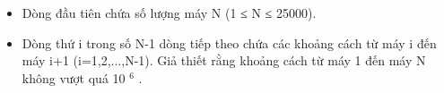 \begin{itemize}
	\item     Dòng đầu tiên chứa số lượng máy N (1 ≤ N ≤ 25000).   
	\item     Dòng thứ i trong số N-1 dòng tiếp theo chứa các khoảng cách từ máy i đến máy i+1 (i=1,2,...,N-1). Giả thiết rằng khoảng cách từ máy 1 đến máy N không vượt quá 10    $^     6    $    .   
\end{itemize}